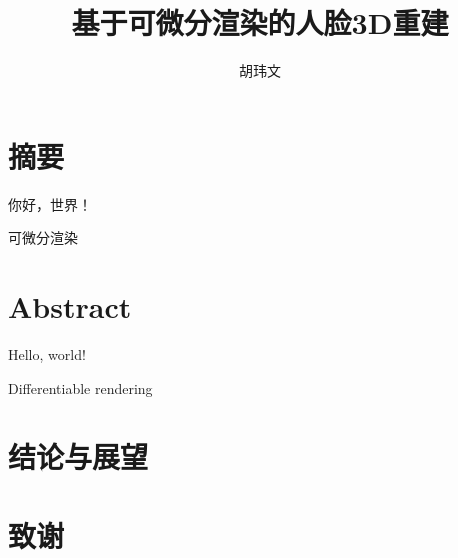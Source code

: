 \documentclass{scutmaster}
\title{基于可微分渲染的人脸3D重建}
\author{胡玮文}
\begin{document}
\maketitle
\maketitleEN
\nominationpage
\declareoforiginality

\frontmatter
\chapter{摘要}

你好，世界！

 可微分渲染

\chapter{Abstract}

Hello, world!

 Differentiable rendering

\tableofcontents

\listoffigures

\mainmatter










\chapter{结论与展望}
\label{chap:conclusion}

\backmatter


\chapter{致谢}
\end{document}
